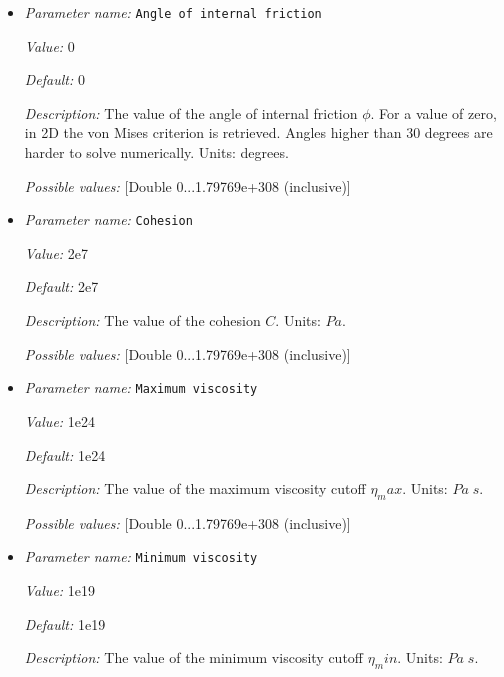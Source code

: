 \begin{itemize}
\item {\it Parameter name:} {\tt Angle of internal friction}
\label{parameters:Material model/Drucker Prager/Viscosity/Angle of internal friction}


{\it Value:} 0


{\it Default:} 0


{\it Description:} The value of the angle of internal friction $\phi$. For a value of zero, in 2D the von Mises criterion is retrieved. Angles higher than 30 degrees are harder to solve numerically. Units: degrees.


{\it Possible values:} [Double 0...1.79769e+308 (inclusive)]
\item {\it Parameter name:} {\tt Cohesion}
\label{parameters:Material model/Drucker Prager/Viscosity/Cohesion}


{\it Value:} 2e7


{\it Default:} 2e7


{\it Description:} The value of the cohesion $C$. Units: $Pa$.


{\it Possible values:} [Double 0...1.79769e+308 (inclusive)]
\item {\it Parameter name:} {\tt Maximum viscosity}
\label{parameters:Material model/Drucker Prager/Viscosity/Maximum viscosity}


{\it Value:} 1e24


{\it Default:} 1e24


{\it Description:} The value of the maximum viscosity cutoff $\eta_max$. Units: $Pa\;s$.


{\it Possible values:} [Double 0...1.79769e+308 (inclusive)]
\item {\it Parameter name:} {\tt Minimum viscosity}
\label{parameters:Material model/Drucker Prager/Viscosity/Minimum viscosity}


{\it Value:} 1e19


{\it Default:} 1e19


{\it Description:} The value of the minimum viscosity cutoff $\eta_min$. Units: $Pa\;s$.



\end{itemize}
